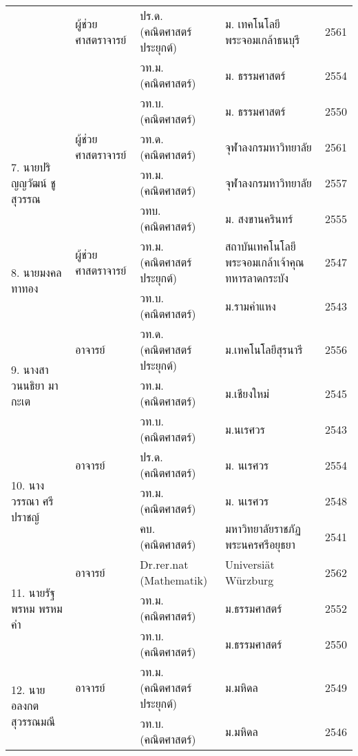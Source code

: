 \begin{center}
{\begin{longtable}{|p{}|p{}|p{}|p{}|p{}|}
\newpage %

		\multirow{3}{*}{6. นางภคีตา สุขประเสริฐ}&	ผู้ช่วยศาสตราจารย์ & ปร.ด. (คณิตศาสตร์ประยุกต์)& ม. เทคโนโลยี\newline พระจอมเกล้าธนบุรี& 2561\\\cline{3-5}
			&& วท.ม. (คณิตศาสตร์)& 	ม. ธรรมศาสตร์& 2554\\\cline{3-5}
			&& วท.บ. (คณิตศาสตร์)& 	ม. ธรรมศาสตร์&2550\\	\hline


		\multirow{3}{*}{7. นายปริญญวัฒน์ ชูสุวรรณ}&ผู้ช่วยศาสตราจารย์&	วท.ด.(คณิตศาสตร์)&จุฬาลงกรมหาวิทยาลัย&2561\\\cline{3-5}
		&&วท.ม. (คณิตศาสตร์)& 	จุฬาลงกรมหาวิทยาลัย& 2557\\\cline{3-5}
		&&วทบ. (คณิตศาสตร์)& ม. สงขานครินทร์&	2555\\	\hline
		
		
		\multirow{2}{*}{8. นายมงคล ทาทอง}&	ผู้ช่วยศาสตราจารย์&วท.ม. (คณิตศาสตร์ประยุกต์)&สถาบันเทคโนโลยีพระจอมเกล้าเจ้าคุณทหารลาดกระบัง&2547\\
		\cline{3-5}
		&&วท.บ. (คณิตศาสตร์)&ม.รามคำแหง&2543\\ \hline
		
		
		\multirow{3}{*}{9. นางสาวนนธิยา มากะเต}&อาจารย์&วท.ด.(คณิตศาสตร์ประยุกต์)&ม.เทคโนโลยีสุรนารี&2556\\\cline{3-5}
		&&วท.ม. (คณิตศาสตร์)&ม.เชียงใหม่&2545\\\cline{3-5}
		&&วท.บ. (คณิตศาสตร์)&	ม.นเรศวร&2543\\\hline
	

		\multirow{3}{*}{10.  นางวรรณา ศรีปราชญ์}& อาจารย์& ปร.ด. (คณิตศาสตร์)& ม. นเรศวร& 2554\\\cline{3-5}
		&& วท.ม. (คณิตศาสตร์)&	ม. นเรศวร&2548\\\cline{3-5}
		&& คบ. (คณิตศาสตร์)& มหาวิทยาลัยราชภัฏพระนครศรีอยุธยา& 2541\\\hline
		

		\multirow{3}{*}{11. นายรัฐพรหม พรหมคำ}&	อาจารย์&Dr.rer.nat (Mathematik)&Universi\"{a}t W\"{u}rzburg&2562\\\cline{3-5}
		&&วท.ม. (คณิตศาสตร์)& ม.ธรรมศาสตร์&2552\\\cline{3-5}
		&&วท.บ. (คณิตศาสตร์)& ม.ธรรมศาสตร์&2550\\\hline
		
		
		\multirow{2}{*}{12. นายอลงกต สุวรรณมณี}&อาจารย์&วท.ม.(คณิตศาสตร์ประยุกต์)& 	ม.มหิดล&2549\\\cline{3-5}
		&&วท.บ. (คณิตศาสตร์)&ม.มหิดล& 2546\\\hline
		

\end{longtable}}
\end{center}
